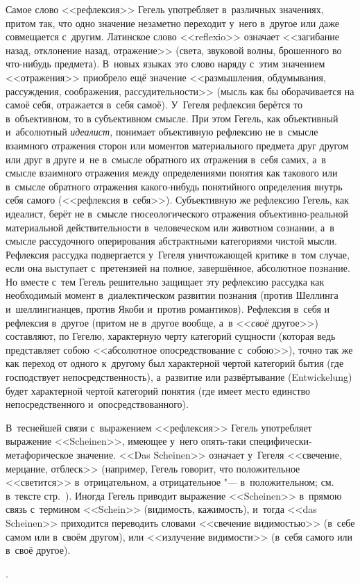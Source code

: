 {Самое слово <<рефлексия>> Гегель употребляет в~различных значениях, притом
так, что одно значение незаметно переходит у~него в~другое или даже
совмещается с~другим. Латинское слово <<reflexio>> означает <<загибание назад,
отклонение назад, отражение>> (света, звуковой волны, брошенного во
что-нибудь предмета). В~новых языках это слово наряду с~этим значением
<<отражения>> приобрело ещё значение <<размышления, обдумывания, рассуждения,
соображения, рассудительности>> (мысль как бы оборачивается на самоё себя,
отражается в~себя самоё). У~Гегеля рефлексия берётся то в~объективном, то в
субъективном смысле. При этом Гегель, как объективный и~абсолютный
{\em идеалист,} понимает объективную рефлексию не в~смысле взаимного
отражения сторон или моментов материального предмета друг другом или друг в
друге и~не в~смысле обратного их отражения в~себя самих, а~в смысле
взаимного отражения между определениями понятия как такового или в~смысле
обратного отражения какого-нибудь понятийного определения внутрь себя
самого (<<рефлексия в~себя>>). Субъективную же рефлексию Гегель, как
идеалист, берёт не в~смысле гносеологического отражения объективно-реальной
материальной действительности в~человеческом или животном сознании, а~в
смысле рассудочного оперирования абстрактными категориями чистой мысли.
Рефлексия рассудка подвергается у~Гегеля уничтожающей критике в~том случае,
если она выступает с~претензией на полное, завершённое, абсолютное
познание. Но вместе с~тем Гегель решительно защищает эту рефлексию рассудка
как необходимый момент в~диалектическом развитии познания (против Шеллинга
и~шеллингианцев, против Якоби и~против романтиков). Рефлексия в~себя и
рефлексия в~другое (притом не в~другое вообще, а~в <<{\em своё} другое>>)
составляют, по Гегелю, характерную черту категорий сущности (которая ведь
представляет собою <<абсолютное опосредствование с~собою>>), точно так же как
переход от одного к~другому был характерной чертой категорий бытия (где
господствует непосредственность), а~развитие или развёртывание
(Ent\-wicke\-lung) будет характерной чертой категорий понятия (где имеет место
единство непосредственного и~опосредствованного).

В~теснейшей связи с~выражением <<рефлексия>> Гегель употребляет выражение
<<Scheinen>>, имеющее у~него опять-таки специфически-метафорическое значение.
<<Das Scheinen>> означает у~Гегеля <<свечение, мерцание, отблеск>> (например,
Гегель говорит, что положительное <<светится>> в~отрицательном, а
отрицательное "--- в~положительном; см. в~тексте стр.~\pageref{scheinen}).
Иногда Гегель приводит выражение <<Scheinen>> в~прямою связь с~термином
<<Schein>> (видимость, кажимость), и~тогда <<das Scheinen>> приходится
переводить словами <<свечение видимостью>> (в~себе самом или в~своём другом),
или <<излучение видимости>> (в~себя самого или в~своё другое).}.
